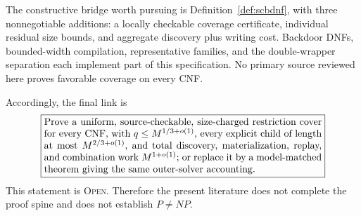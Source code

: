 \documentclass[11pt]{article}
\newcommand{\Open}{\textsc{Open}}
\begin{document}
The constructive bridge worth pursuing is Definition~\ref{def:scbdnf}, with
three nonnegotiable additions: a locally checkable coverage certificate,
individual residual size bounds, and aggregate discovery plus writing cost.
Backdoor DNFs, bounded-width compilation, representative families, and the
double-wrapper separation each implement part of this specification.  No
primary source reviewed here proves favorable coverage on every CNF.

Accordingly, the final link is
\[
 \boxed{\begin{minipage}{0.82\textwidth}
 Prove a uniform, source-checkable, size-charged restriction cover for every
 CNF, with $q\le M^{1/3+o(1)}$, every explicit child of length at most
 $M^{2/3+o(1)}$, and total discovery, materialization, replay, and combination
 work $M^{1+o(1)}$; or replace it by a model-matched theorem giving the same
 outer-solver accounting.
 \end{minipage}}
\]
This statement is \Open.  Therefore the present literature does not complete
the proof spine and does not establish $P\ne NP$.
\end{document}
